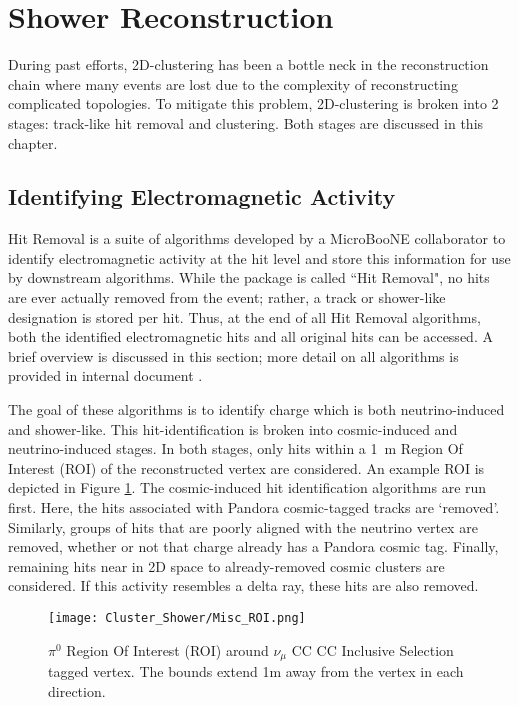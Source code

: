 \clearpage
\section{Shower Reconstruction}
During past efforts, 2D-clustering has been a bottle neck in the reconstruction chain where many events are lost due to the complexity of reconstructing complicated topologies. To mitigate this problem, 2D-clustering is broken into 2 stages: track-like hit removal and clustering. Both stages are discussed in this chapter.

\subsection{Identifying Electromagnetic Activity}
Hit Removal is a suite of algorithms developed by a MicroBooNE collaborator to identify electromagnetic activity at the hit level and store this information for use by downstream algorithms. While the package is called ``Hit Removal", no hits are ever actually removed from the event; rather, a track or shower-like designation is stored per hit. Thus, at the end of all Hit Removal algorithms, both the identified electromagnetic hits and all original hits can be accessed. A brief overview is discussed in this section; more detail on all algorithms is provided in internal document \cite{bib:davidc_hitremoval}.

\par The goal of these algorithms is to identify charge which is both neutrino-induced and shower-like. This hit-identification is broken into cosmic-induced and neutrino-induced stages.  In both stages, only hits within a 1~m Region Of Interest (ROI) of the reconstructed vertex are considered. An example ROI is depicted in Figure \ref{fig:roi}. The cosmic-induced hit identification algorithms are run first.  Here, the hits associated with Pandora cosmic-tagged tracks are `removed'.  Similarly, groups of hits that are poorly aligned with the neutrino vertex are removed, whether or not that charge already has a Pandora cosmic tag. Finally, remaining hits near in 2D space to already-removed cosmic clusters are considered. If this activity resembles a delta ray, these hits are also removed. 

\begin{figure}[h!]
\centering
\texttt{[image: Cluster\_Shower/Misc\_ROI.png]}
\caption{$\pi^0$ Region Of Interest (ROI) around $\nu_\mu$ CC CC Inclusive Selection tagged  vertex. The bounds extend 1m away from the vertex in each direction. }
\label{fig:roi}
\end{figure}

